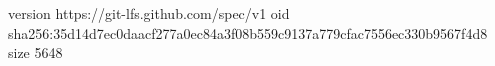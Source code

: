 version https://git-lfs.github.com/spec/v1
oid sha256:35d14d7ec0daacf277a0ec84a3f08b559c9137a779cfac7556ec330b9567f4d8
size 5648
